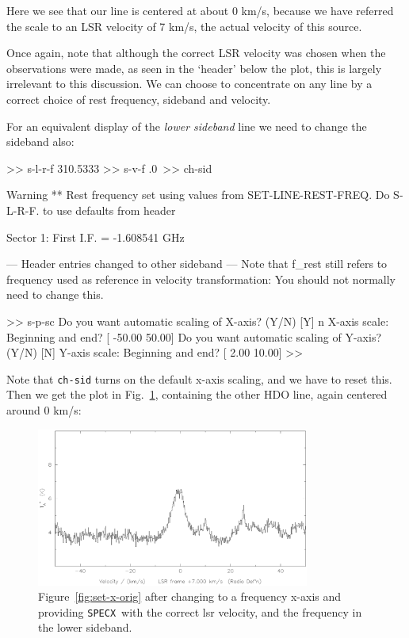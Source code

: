 \documentclass[11pt,twoside]{starlink}
\providecommand{\SPECX}{\texttt{SPECX}}
\begin{document}
Here we see that our line is centered at about 0 km/s, because we have
referred the scale to an LSR velocity of 7 km/s, the actual velocity of
this source.

Once again, note that although the correct LSR velocity was chosen
when the observations were made, as seen in the `header' below the
plot, this is largely irrelevant to this discussion. We can choose to
concentrate on any line by a correct choice of rest frequency,
sideband and velocity.

For an equivalent display of the \textit{lower sideband} line we need to
change the sideband also:
\begin{terminalv}
 >> s-l-r-f 310.5333
 >> s-v-f \y\lsr\rad\7.0\
 >> ch-sid

 Warning ** Rest frequency set using values from SET-LINE-REST-FREQ.
 Do S-L-R-F. to use defaults from header

 Sector  1: First I.F. = -1.608541 GHz

  --- Header entries changed to other sideband ---
      Note that f_rest still refers to frequency
      used as reference in velocity transformation:
      You should not normally need to change this.

 >> s-p-sc
 Do you want automatic scaling of X-axis? (Y/N) [Y] n
 X-axis scale: Beginning and end? [ -50.00   50.00]
 Do you want automatic scaling of Y-axis? (Y/N) [N]
 Y-axis scale: Beginning and end? [   2.00   10.00]
 >>
\end{terminalv}


Note that \texttt{ch-sid} turns on the default x-axis scaling, and we
have to reset this.  Then we get the plot in Fig.~\ref{fig:set-to-lsb},
containing the other HDO line, again centered around 0 km/s:

\begin{figure}[ht]
\centering
\includegraphics[width=0.8\textwidth]{sc8_hdo-lsb}
\caption[Part of the same in the LSB ]
{\small{Figure~\ref{fig:set-x-orig} after changing to a frequency
x-axis and providing \SPECX\ with the correct lsr velocity, and the
frequency in the lower sideband.
}}
\label{fig:set-to-lsb}
\end{figure}
\end{document}
